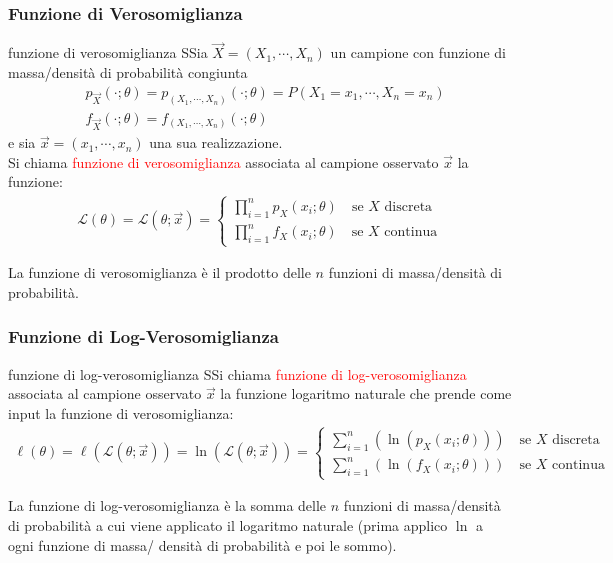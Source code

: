 \documentclass{article}  %
\theoremstyle{definition}
\begin{document}
\subsubsection{Funzione di Verosomiglianza}
\begin{theorem}{funzione di verosomiglianza}
	SSia $\vec{X}=(X_1, \cdots, X_n)$ un campione con funzione di massa/densità di probabilità congiunta
	\begin{align*}
		 & p_{\vec{X}}(\cdot;\theta) = p_{(X_1,\cdots,X_n)}(\cdot;\theta)=P(X_1=x_1, \cdots, X_n=x_n) \\
		 & f_{\vec{X}}(\cdot;\theta) = f_{(X_1,\cdots,X_n)}(\cdot;\theta)
	\end{align*}
	e sia $\vec{x}=(x_1,\cdots, x_n)$ una sua realizzazione. \\
	Si chiama \textcolor{red}{funzione di verosomiglianza} associata al campione osservato $\vec{x}$ la funzione:
	\begin{align*}
		\mathscr{L}(\theta) = \mathscr{L}(\theta; \vec{x}) = \begin{cases}
			                                                     \prod_{i=1}^{n}p_X(x_i;\theta) \quad \text{se } X \text{ discreta} \\
			                                                     \prod_{i=1}^{n}f_X(x_i;\theta) \quad \text{se } X \text{ continua}
		                                                     \end{cases}
	\end{align*}
\end{theorem}
La funzione di verosomiglianza è il prodotto delle $n$ funzioni di massa/densità di probabilità.

\subsubsection{Funzione di Log-Verosomiglianza}
\begin{theorem}{funzione di log-verosomiglianza}
	SSi chiama \textcolor{red}{funzione di log-verosomiglianza} associata al campione osservato $\vec{x}$ la funzione logaritmo naturale che prende come input la funzione
	di verosomiglianza:
	\begin{align*}
		\ell(\theta) = \ell(\mathscr{L}(\theta; \vec{x})) =\ln(\mathscr{L}(\theta; \vec{x})) = \begin{cases}
			                                                                                       \sum_{i=1}^{n}\left(\ln\left(p_X(x_i;\theta)\right)\right) \quad \text{se } X \text{ discreta} \\
			                                                                                       \sum_{i=1}^{n}\left(\ln\left(f_X(x_i;\theta)\right)\right) \quad \text{se } X \text{ continua}
		                                                                                       \end{cases}
	\end{align*}
\end{theorem}
La funzione di log-verosomiglianza è la somma delle $n$ funzioni di massa/densità di probabilità a cui viene applicato il logaritmo naturale (prima applico $\ln$ a ogni funzione di massa/
densità di probabilità e poi le sommo).
\end{document}
